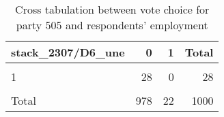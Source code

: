 \documentclass[
]{article}
\begin{document}
\begin{table}

\caption{\label{tab:unnamed-chunk-152}Cross tabulation between vote choice for party 505 and respondents' employment
                   \label{table:crosstab_2_ro}}
\centering
\begin{tabular}[t]{l|r|r|r}
\hline
stack\_2307/D6\_une & 0 & 1 & Total\\
\hline
\cellcolor{gray!6}{0} & \cellcolor{gray!6}{923} & \cellcolor{gray!6}{21} & \cellcolor{gray!6}{944}\\
\hline
1 & 28 & 0 & 28\\
\hline
\cellcolor{gray!6}{NA} & \cellcolor{gray!6}{27} & \cellcolor{gray!6}{1} & \cellcolor{gray!6}{28}\\
\hline
Total & 978 & 22 & 1000\\
\hline
\end{tabular}
\end{table}
\end{document}
